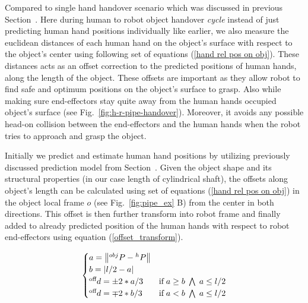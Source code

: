 Compared to single hand handover scenario which was discussed in previous Section~. Here during human to robot object handover \textit{cycle} instead of just predicting human hand positions individually like earlier, we also measure the euclidean distances of each human hand on the object's surface with respect to the object's center using following set of equations (\ref{hand rel pos on obj}). These distances acts as an offset correction to the predicted positions of human hands, along the length of the object. These offsets are important as they allow robot to find safe and optimum positions on the object's surface to grasp. Also while making sure end-effectors stay quite away from the human hands occupied object's surface (see Fig.~\ref{fig:h-r-pipe-handover}). Moreover, it avoids any possible head-on collision between the end-effectors and the human hands when the robot tries to approach and grasp the object.


Initially we predict and estimate human hand positions by utilizing previously discussed prediction model from Section~. Given the object shape and its structural properties (in our case length of cylindrical shaft), the offsets along object's length can be calculated using set of equations (\ref{hand rel pos on obj}) in the object local frame $o$ (see Fig.~\ref{fig:pipe_ex} B) from the center in both directions. This offset is then further transform into robot frame and finally added to already predicted position of the human hands with respect to robot end-effectors using equation (\ref{offset_transform}).


\begin{equation}\label{hand rel pos on obj}
\centering
\begin{cases}
a = \norm{{}^{obj}{P} - {}^{h}{P}} & \text{}  \\

b = \abs{l/2 - a}  & \text{} \\

{}^\text{off}{d} = \pm 2*a/3 &  \text{if} \; a \geq b \; \bigwedge \; a\leq l/2\\

{}^\text{off}{d} = \mp 2*b/3 &  \text{if} \; a < b \; \bigwedge \; a\leq l/2\\
\end{cases}
\end{equation}

